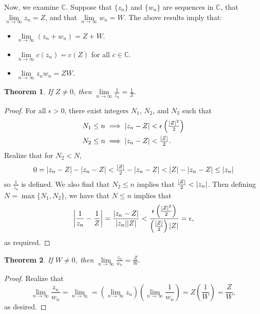 \documentclass[11pt]{article}
\newtheorem{theorem}{Theorem}
\begin{document}
Now, we examine $\mathbb{C}$. Suppose that $\{ z_{n} \}$ and $\{ w_{n} \}$ are sequences in $\mathbb{C}$, that $\lim\limits_{n \to \infty} z_{n} = Z$, and that $\lim\limits_{n \to \infty} w_{n} = W$. The above results imply that:

\begin{itemize}
	\item $\lim\limits_{n \to \infty} (z_{n} + w_{n}) = Z + W$.
	\item $\lim\limits_{n \to \infty} c (z_{n}) = c (Z)$ for all $c \in \mathbb{C}$.
	\item $\lim\limits_{n \to \infty} z_{n}w_{n} = ZW$.
\end{itemize}

\begin{theorem}
	If $Z \ne 0$, then $\lim\limits_{n \to \infty} \frac{1}{z_{n}} = \frac{1}{Z}$.
\end{theorem}
\begin{adjustwidth}{0.5cm}{}
	\begin{proof}
		For all $\epsilon > 0$, there exist integers $N_{1}$, $N_{2}$, and $N_{3}$ such that
		\begin{align*}
			N_{1} \le n & \implies \abs{z_{n} - Z} < \epsilon \left(\tfrac{\abs{Z}^{2}}{2}\right) \\
			N_{2} \le n & \implies \abs{z_{n} - Z} < \tfrac{\abs{Z}}{2}.
		\end{align*}
		Realize that for $N_{2} < N$,
		\[
			0 = \abs{z_{n} - Z} - \abs{z_{n} - Z} < \tfrac{\abs{Z}}{2} - \abs{z_{n} - Z} < \abs{Z} - \abs{z_{n} - Z} \le \abs{z_{n}}
		\]
		so $\frac{1}{z_{n}}$ is defined. We also find that $N_{2} \le n$ implies that $\tfrac{\abs{Z}}{2} < \abs{z_{n}}$. Then defining $N = \max \{ N_{1}, N_{2} \}$, we have that $N \le n$ implies that
		\[
			\abs{\frac{1}{z_{n}} - \frac{1}{Z}} = \frac{\abs{z_{n} - Z}}{\abs{z_{n}} \abs{Z}} < \frac{\epsilon \left( \tfrac{\abs{Z}^{2}}{2} \right)}{\left( \tfrac{\abs{Z}}{2} \right) \abs{Z}} = \epsilon,
		\]
		as required.
	\end{proof}
\end{adjustwidth}

\begin{theorem}
	If $W \ne 0$, then $\lim\limits_{n \to \infty} \frac{z_{n}}{w_{n}} = \frac{Z}{W}$.
\end{theorem}
\begin{adjustwidth}{0.5cm}{}
	\begin{proof}
		Realize that
		\[
			\lim\limits_{n \to \infty} \frac{z_{n}}{w_{n}} = \lim\limits_{n \to \infty} = \left( \lim\limits_{n \to \infty} z_{n} \right) \left( \lim\limits_{n \to \infty} \frac{1}{w_{n}} \right)= Z \left( \frac{1}{W} \right) = \frac{Z}{W},
		\]
		as desired.
	\end{proof}
\end{adjustwidth}
\end{document}
